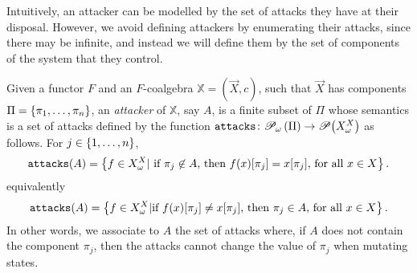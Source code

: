 Intuitively, an attacker can be modelled by the set of attacks they have at their disposal. However, we avoid defining attackers by enumerating their attacks, since there may be infinite, and instead we will define them by the set of components of the system that they control. 

\begin{definition}[Attacker]
Given a functor $F$ and an $F$-coalgebra $\mathbb{X}=(\vec{X},c)$, such that $\vec{X}$ has components $\Pi=\left\{\pi_1, \ldots, \pi_n\right\}$, an \emph{attacker} of $\mathbb{X}$, say $A$, is a {finite} subset of $\Pi$ whose semantics is a set of attacks defined by the function $\texttt{attacks}\colon {{{\mathscr{P}}_\omega}\left(\Pi\right)}\rightarrow{{\mathscr{P}}\!\left({X^X_\omega}\right)}$ as follows. 
For $j\in \left\{1, \ldots,  n\right\}$,  
\begin{align}
\texttt{attacks}(A)=\left\{f\in X^X_\omega | \text{ if $\pi_j \not\in A$, then $f(x)[\pi_j]=x[\pi_j]$, for all $x\in X$}\right\}.
\end{align}
{\color{red}
equivalently
\begin{align}
\texttt{attacks}(A)=\left\{f\in X^X_\omega | \text{if $f(x)[\pi_j]\neq x[\pi_j]$, then $\pi_j \in A$, for all $x\in X$}\right\}.
\end{align}
}
In other words, we associate to $A$ the set of attacks where, if $A$ does not contain the component $\pi_j$, then the attacks cannot change the value of $\pi_j$ when mutating states.
 \end{definition}
% 
%
